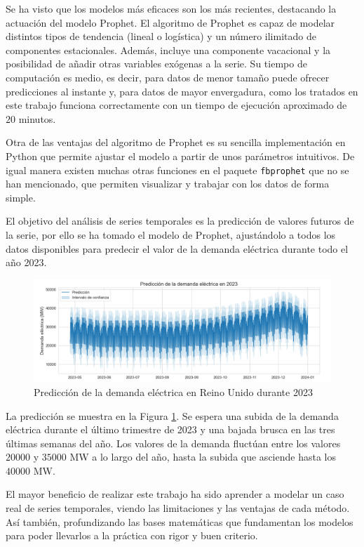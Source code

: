 \documentclass[12pt,twoside]{article}
\begin{document}
Se ha visto que los modelos más eficaces son los más recientes, destacando la actuación del modelo Prophet. El algoritmo de Prophet es capaz de modelar distintos tipos de tendencia (lineal o logística) y un número ilimitado de componentes estacionales. Además, incluye una componente vacacional y la posibilidad de añadir otras variables exógenas a la serie. Su tiempo de computación es medio, es decir, para datos de menor tamaño puede ofrecer predicciones al instante y, para datos de mayor envergadura, como los tratados en este trabajo funciona correctamente con un tiempo de ejecución aproximado de $20$ minutos. 

Otra de las ventajas del algoritmo de Prophet es su sencilla implementación en Python que permite ajustar el modelo a partir de unos parámetros intuitivos. De igual manera existen muchas otras funciones en el paquete \texttt{fbprophet} que no se han mencionado, que permiten visualizar y trabajar con los datos de forma simple.

El objetivo del análisis de series temporales es la predicción de valores futuros de la serie, por ello se ha tomado el modelo de Prophet, ajustándolo a todos los datos disponibles para predecir el valor de la demanda eléctrica durante todo el año 2023.

\begin{figure}[h]
\centering
    \includegraphics[width = \textwidth]{imagenes/prophet_future_predition.png}
    \caption{Predicción de la demanda eléctrica en Reino Unido durante 2023}\label{fig:prophet_future}
\end{figure}

La predicción se muestra en la Figura \ref{fig:prophet_future}. Se espera una subida de la demanda eléctrica durante el último trimestre de 2023 y una bajada brusca en las tres últimas semanas del año. Los valores de la demanda fluctúan entre los valores $20000$ y $35000$ MW a lo largo del año, hasta la subida que asciende hasta los $40000$ MW.



El mayor beneficio de realizar este trabajo ha sido aprender a modelar un caso real de series temporales, viendo las limitaciones y las ventajas de cada método. Así también, profundizando  las bases matemáticas que fundamentan los modelos para poder llevarlos a la práctica con rigor y buen criterio.
\end{document}
